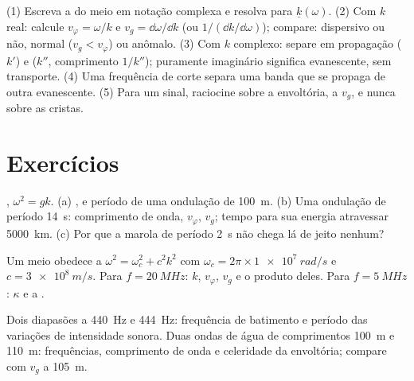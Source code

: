 \begin{method}\label{met:b2:dispersion-wave-packets:method}
(1) Escreva a  do meio em notação complexa e
resolva para $\underline k(\omega)$. (2) Com $k$ real: calcule $v_\varphi = \omega/k$ e
$v_g = \dd\omega/\dd k$ (ou $1/(\dd k/\dd\omega)$); compare: dispersivo ou não,
normal ($v_g < v_\varphi$) ou anômalo. (3) Com $k$ complexo: separe em
propagação ($k'$) e  ($k''$, comprimento $1/k''$); puramente
imaginário significa evanescente, sem transporte. (4) Uma frequência de corte
separa uma banda que se propaga de outra evanescente. (5) Para um sinal,
raciocine sobre a envoltória, a $v_g$, e nunca sobre as cristas.
\end{method}

\section{Exercícios}

\begin{exercise}[$\star$]\label{exo:b2:dispersion-wave-packets:1}
, $\omega^2 = gk$. (a) ,  e
período de uma ondulação de \qty{100}{m}. (b) Uma ondulação de período \qty{14}{s}:
comprimento de onda, $v_\varphi$, $v_g$; tempo para sua energia atravessar \qty{5000}{km}.
(c) Por que a marola de período \qty{2}{s} não chega lá de jeito nenhum?
\end{exercise}

\begin{exercise}[$\star$]\label{exo:b2:dispersion-wave-packets:2}
Um meio obedece a $\omega^2 = \omega_c^2 + c^2k^2$ com $\omega_c = 2\pi \times \qty{1e7}{rad/s}$
e $c = \qty{3e8}{m/s}$. Para $f = \qty{20}{MHz}$: $k$, $v_\varphi$, $v_g$ e
o produto deles. Para $f = \qty{5}{MHz}$: $\kappa$ e a .
\end{exercise}

\begin{exercise}[$\star$]\label{exo:b2:dispersion-wave-packets:3}
Dois diapasões a \qty{440}{Hz} e \qty{444}{Hz}: frequência de batimento e
período das variações de intensidade sonora. Duas ondas de água de comprimentos
\qty{100}{m} e \qty{110}{m}: frequências, comprimento de onda e celeridade da
envoltória; compare com $v_g$ a \qty{105}{m}.
\end{exercise}

